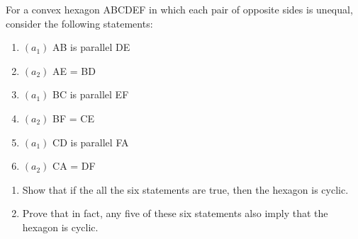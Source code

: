 \item For a convex hexagon ABCDEF in which each pair of opposite sides is unequal, consider the following statements:
\begin{enumerate}
\item $(a_1)$ AB is parallel DE    
\item $(a_2)$ AE = BD
\item $(a_1)$ BC is parallel EF      
\item $(a_2)$ BF = CE
\item $(a_1)$ CD is parallel FA      
\item $(a_2)$ CA = DF
\end{enumerate}

\begin{enumerate}
\item Show that if the all the six statements are true, then the hexagon is cyclic.
\item Prove that in fact, any five of these six statements also imply that the hexagon is cyclic. 
\end{enumerate}

























